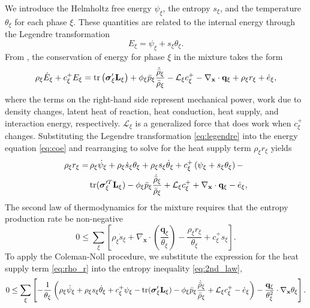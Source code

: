\documentclass[11pt]{article}
\begin{document}
We introduce the Helmholtz free energy $\psi_\xi$, the entropy $s_\xi$, and the temperature $\theta_\xi$ for each phase $\xi$. These quantities are related to the internal energy through the Legendre transformation
%
\begin{equation}
  E_\xi = \psi_\xi + s_\xi \theta_{\xi}.
  \label{eq:legendre}
\end{equation}
%
From \cite{drumheller2000}, the conservation of energy for phase $\xi$ in the mixture takes the form
\begin{equation}
  \rho_{\xi} \dot{E}_{\xi} + c_{\xi}^{+} E_{\xi} = \mathrm{tr}\left(\boldsymbol{\sigma}^{\prime}_{\xi} \mathbf{L}_{\xi}\right) + \phi_{\xi}\bar{p}_\xi  \frac{\dot{\bar\rho}_{\xi}}{\bar\rho_{\xi}} - \mathcal{L}_{\xi} c_{\xi}^{+} - \nabla_{\mathbf{x}} \cdot \mathbf{q}_{\xi} + \rho_{\xi} r_{\xi} + \dot{e}_{\xi},
  \label{eq:coe}
\end{equation}
%
where the terms on the right-hand side represent mechanical power, work due to density changes, latent heat of reaction, heat conduction, heat supply, and interaction energy, respectively. $\mathcal{L}_\xi$ is a generalized force that does work when $c^{+}_\xi$ changes.  Substituting the Legendre transformation \eqref{eq:legendre} into the energy equation \eqref{eq:coe} and rearranging to solve for the heat supply term $\rho_\xi r_{\xi}$ yields
%
\begin{align}
  \rho_{\xi} r_{\xi} =& \, \rho_{\xi} \dot{\psi}_{\xi} + \rho_\xi \dot{s}_\xi \theta_\xi + \rho_\xi s_\xi \dot\theta_\xi + c_{\xi}^{+} \left(\psi_{\xi} + s_\xi \theta_\xi\right) - \notag \\
  & \, \mathrm{tr}(\boldsymbol{\sigma}^{\prime T}_{\xi} \mathbf{L}_{\xi}) - \phi_{\xi} \bar{p}_\xi \frac{\dot{\bar\rho}_{\xi}}{\bar\rho_{\xi}} + \mathcal{L}_{\xi} c_{\xi}^{+} + \nabla_{\mathbf{x}} \cdot \mathbf{q}_{\xi} - \dot{e}_{\xi}, \label{eq:rho_r}
\end{align}
%
The second law of thermodynamics for the mixture requires that the entropy production rate be non-negative
%
\begin{equation}
  0 \leq \sum_{\xi} \left[ \rho_{\xi} \dot{s}_{\xi} + \nabla_{\mathbf{x}} \cdot \left( \frac{\mathbf{q}_{\xi}}{\theta_{\xi}} \right) - \frac{\rho_{\xi} r_{\xi}}{\theta_{\xi}} + c_{\xi}^{+} s_{\xi} \right].
  \label{eq:2nd_law}
\end{equation}
%
To apply the Coleman-Noll procedure, we substitute the expression for the heat supply term \eqref{eq:rho_r} into the entropy inequality \eqref{eq:2nd_law},
%
\begin{equation}
  0 \leq \sum_{\xi} \left[    - \frac{1}{\theta_{\xi}} \left( \rho_{\xi} \dot{\psi}_{\xi} +  \rho_\xi s_\xi \dot\theta_\xi + c_{\xi}^{+} \psi_{\xi}  - \mathrm{tr}(\boldsymbol{\sigma}^{\prime}_{\xi} \mathbf{L}_{\xi}) - \phi_{\xi} \bar{p}_\xi \frac{\dot{\bar\rho}_{\xi}}{\bar\rho_{\xi}} + \mathcal{L}_{\xi} c_{\xi}^{+} - \dot{e}_{\xi}\right) - \frac{\mathbf{q}_\xi}{\theta^2_{\xi}} \cdot \nabla_{\mathbf{x}} \theta_\xi \right].
  \label{eq:2nd_law_expand_1}
\end{equation}
\end{document}
